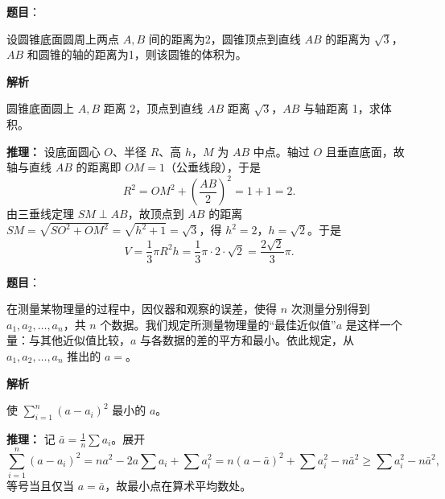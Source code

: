 \begin{answer}

\textbf{题目}：

设圆锥底面圆周上两点 $A,B$ 间的距离为2，圆锥顶点到直线 $AB$ 的距离为 $\sqrt3$，$AB$ 和圆锥的轴的距离为1，则该圆锥的体积为\underline{\qquad\qquad}。

\textbf{解析}

圆锥底面圆上 $A,B$ 距离 2，顶点到直线 $AB$ 距离 $\sqrt3$，$AB$ 与轴距离 1，求体积。

\textbf{推理：} 设底面圆心 $O$、半径 $R$、高 $h$，$M$ 为 $AB$ 中点。轴过 $O$ 且垂直底面，故轴与直线 $AB$ 的距离即 $OM=1$（公垂线段），于是
\nopagebreak[4]
\[R^2=OM^2+\left(\frac{AB}2\right)^2=1+1=2.\]
由三垂线定理 $SM\perp AB$，故顶点到 $AB$ 的距离 $SM=\sqrt{SO^2+OM^2}=\sqrt{h^2+1}=\sqrt3$，得 $h^2=2$，$h=\sqrt2$。于是
\nopagebreak[4]
\[V=\frac13\pi R^2h=\frac13\pi\cdot2\cdot\sqrt2=\frac{2\sqrt2}{3}\pi.\]


\end{answer}
\begin{answer}

\textbf{题目}：

在测量某物理量的过程中，因仪器和观察的误差，使得 $n$ 次测量分别得到 $a_1,a_2,\ldots,a_n$，共 $n$ 个数据。我们规定所测量物理量的“最佳近似值”$a$ 是这样一个量：与其他近似值比较，$a$ 与各数据的差的平方和最小。依此规定，从 $a_1,a_2,\ldots,a_n$ 推出的 $a=$\underline{\qquad\qquad}。

\textbf{解析}

使 $\sum_{i=1}^n(a-a_i)^2$ 最小的 $a$。

\textbf{推理：} 记 $\bar a=\frac1n\sum a_i$。展开
\nopagebreak[4]
\[\sum_{i=1}^n(a-a_i)^2=na^2-2a\sum a_i+\sum a_i^2=n(a-\bar a)^2+\sum a_i^2-n\bar a^2\ge \sum a_i^2-n\bar a^2,\]
等号当且仅当 $a=\bar a$，故最小点在算术平均数处。


\par\medskip

\end{answer}
